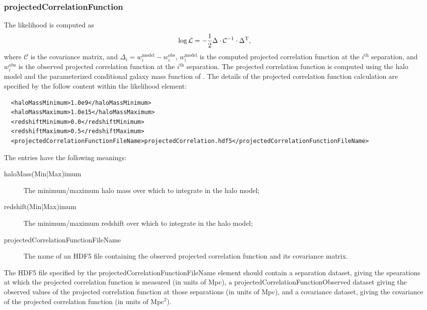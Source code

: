 \subsubsection{projectedCorrelationFunction}

The likelihood is computed as
\begin{equation}
\log \mathcal{L} = -{1\over2} \Delta \cdot \mathcal{C}^{-1} \cdot \Delta^\mathrm{T},
\end{equation}
where $\mathcal{C}$ is the covariance matrix, and $\Delta_i = w_i^\mathrm{model} - w_i^\mathrm{obs}$, $w_i^\mathrm{model}$ is the computed projected correlation function at the $i^\mathrm{th}$ separation, and $w_i^\mathrm{obs}$ is the observed projected correlation function at the $i^\mathrm{th}$ separation. The projected correlation function is computed using the halo model and the parameterized conditional galaxy mass function of \cite[][see also \protect\cite{leauthaud_new_2011}; \S\protect\ref{phys:conditionalMassFunction:conditionalMassFunctionBehroozi2010}]{behroozi_comprehensive_2010}. The details of the projected correlation function calculation are specified by the follow content within the {\normalfont \ttfamily likelihood} element:
\begin{verbatim}
  <haloMassMinimum>1.0e9</haloMassMinimum>
  <haloMassMaximum>1.0e15</haloMassMaximum>
  <redshiftMinimum>0.0</redshiftMinimum>
  <redshiftMaximum>0.5</redshiftMaximum>
  <projectedCorrelationFunctionFileName>projectedCorrelation.hdf5</projectedCorrelationFunctionFileName>
\end{verbatim}

The entries have the following meanings:
\begin{description}
\item[{\normalfont \ttfamily haloMass(Min|Max)imum}] The minimum/maximum halo mass over which to integrate in the halo model;
\item[{\normalfont \ttfamily redshift(Min|Max)imum}] The minimum/maximum redshift over which to integrate in the halo model;
\item[{\normalfont \ttfamily projectedCorrelationFunctionFileName}] The name of an HDF5 file containing the observed projected correlation function and its covariance matrix.
\end{description}

The HDF5 file specified by the {\normalfont \ttfamily projectedCorrelationFunctionFileName} element should contain a {\normalfont \ttfamily separation} dataset, giving the spearations at which the projected correlation function is measured (in units of Mpc), a {\normalfont \ttfamily projectedCorrelationFunctionObserved} dataset giving the observed values of the projected correlation function at those separations (in units of Mpc), and a {\normalfont \ttfamily covariance} dataset, giving the covariance of the projected correlation function (in units of Mpc$^2$).

